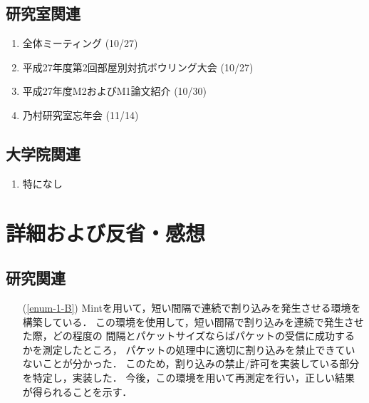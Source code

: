 \documentclass[fleqn, 14pt]{extarticle}
\begin{document}
    \subsection{研究室関連}
    \label{sec-2-2}
    \begin{enumerate}

        \item 全体ミーティング
            \hfill
            \label{enum-18}
            (10/27)

        \item 平成27年度第2回部屋別対抗ボウリング大会
            \hfill
            \label{enum-18}
            (10/27)

        \item 平成27年度M2およびM1論文紹介
            \hfill
            \label{enum-18}
            (10/30)

        \item 乃村研究室忘年会
            \hfill
            \label{enum-18}
            (11/14)

    \end{enumerate}

    \subsection{大学院関連}
    \label{sec2-3}
    \begin{enumerate}

        \item 特になし
            \hfill
            \label{enum-univ1}

    \end{enumerate}

    \section{詳細および反省・感想}
    \label{sec-3}

    \subsection{研究関連}
    \label{sec-3-2}

    \begin{itemize}

        \item[(\ref{enum-1-B})]
            Mintを用いて，短い間隔で連続で割り込みを発生させる環境を構築している．
            この環境を使用して，短い間隔で割り込みを連続で発生させた際，どの程度の
            間隔とパケットサイズならばパケットの受信に成功するかを測定したところ，
            パケットの処理中に適切に割り込みを禁止できていないことが分かった．
            このため，割り込みの禁止/許可を実装している部分を特定し，実装した．
            今後，この環境を用いて再測定を行い，正しい結果が得られることを示す．

    \end{itemize}
\end{document}
